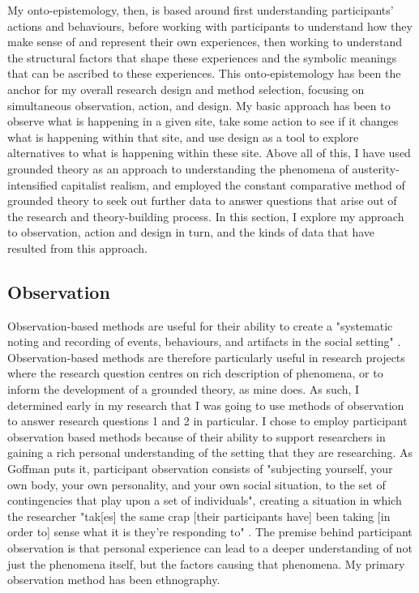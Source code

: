 My onto-epistemology, then, is based around first understanding participants' actions and behaviours, before working with participants to understand how they make sense of and represent their own experiences, then working to understand the structural factors that shape these experiences and the symbolic meanings that can be ascribed to these experiences. This onto-epistemology has been the anchor for my overall research design and method selection, focusing on simultaneous observation, action, and design. My basic approach has been to observe what is happening in a given site, take some action to see if it changes what is happening within that site, and use design as a tool to explore alternatives to what is happening within these site. Above all of this, I have used grounded theory as an approach to understanding the phenomena of austerity-intensified capitalist realism, and employed the constant comparative method of grounded theory to seek out further data to answer questions that arise out of the research and theory-building process. In this section, I explore my approach to observation, action and design in turn, and the kinds of data that have resulted from this approach. 

\subsection{Observation}
\label{3-2-1-observation}
Observation-based methods are useful for their ability to create a "systematic noting and recording of events, behaviours, and artifacts in the social setting" \citep[p. 139]{marshall_designing_2010}. Observation-based methods are therefore particularly useful in research projects where the research question centres on rich description of phenomena, or to inform the development of a grounded theory, as mine does. As such, I determined early in my research that I was going to use methods of observation to answer research questions 1 and 2 in particular. I chose to employ participant observation based methods because of their ability to support researchers in gaining a rich personal understanding of the setting that they are researching. As Goffman puts it, participant observation consists of "subjecting yourself, your own body, your own personality, and your own social situation, to the set of contingencies that play upon a set of individuals", creating a situation in which the researcher "tak[es] the same crap [their participants have] been taking [in order to] sense what it is they’re responding to"  \citep[p. 125]{goffman_fieldwork_1989}. The premise behind participant observation is that personal experience can lead to a deeper understanding of not just the phenomena itself, but the factors causing that phenomena. My primary observation method has been ethnography. 

